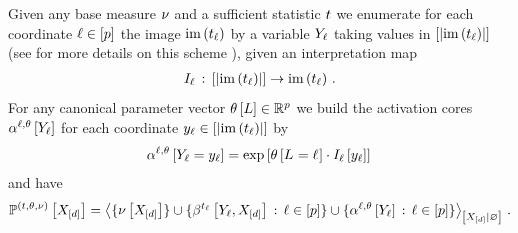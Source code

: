 \begin{theorem}
    \label{the:expFamilyTensorRep}
    Given any base measure $\nu$ and a sufficient statistic $t$ we enumerate for each coordinate $\ell\in[p]$ the image $\mathrm{im}\left(t_{\ell}\right)$ by a variable $Y_{\ell}$ taking values in $[\left|\mathrm{im}\left(t_{\ell}\right)\right|]$ (see for more details on this scheme ), given an interpretation map
    \begin{align*}
        I_{\ell} \,:\,
        [\left|\mathrm{im}\left(t_{\ell}\right)\right|] \rightarrow \mathrm{im}\left(t_{\ell}\right) \, .
    \end{align*}
    For any canonical parameter vector $\theta\left[L\right]\in\mathbb{R}^{p}$ we build the activation cores $\alpha^{\ell,\theta}\left[Y_{\ell}\right]$ for each coordinate $y_{\ell}\in[\left|\mathrm{im}\left(t_{\ell}\right)\right|]$ by
    \begin{align*}
        \alpha^{\ell,\theta}\left[Y_{\ell}=y_{\ell}\right]
        = \mathrm{exp}\left[\theta\left[L_{}=\ell_{}\right] \cdot I_{\ell}\left[y_{\ell}\right] \right] \,
    \end{align*}
    and have
    \begin{align*}
        \expdistwith =
        \normalizationof{\{\basemeasurewith\} \cup \{\bencodingofat{\sstatcoordinateof{\selindex}}{\headvariableof{\selindex},\shortcatvariables} \wcols \selindexin\}\cup\{\softactlegwith \wcols \selindexin\}}{\shortcatvariables} \, .
    \end{align*}
\end{theorem}
